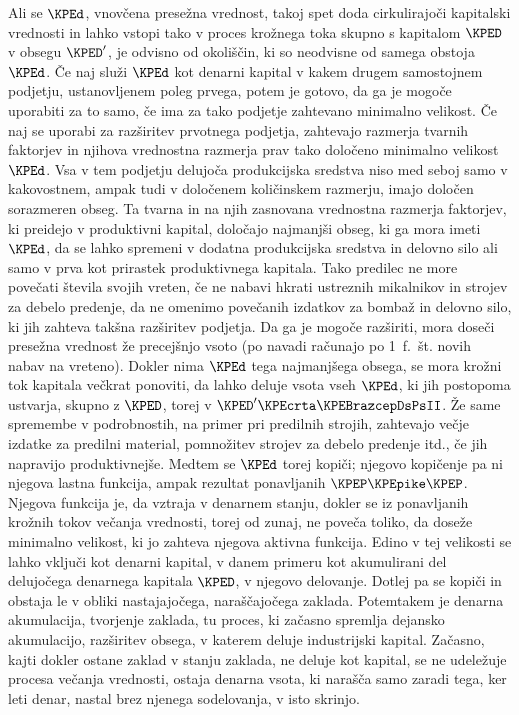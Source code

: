 \documentclass[kapital_02.tex]{subfiles}
\begin{document}
Ali \KPEstran se \( \KPEd \), vnovčena presežna vrednost, takoj spet doda cirkulirajoči kapitalski vrednosti in lahko vstopi tako v proces krožnega toka skupno s kapitalom \( \KPED \) v obsegu \( \KPED' \), je odvisno od okoliščin, ki so neodvisne od samega obstoja \( \KPEd \). Če naj služi \( \KPEd \) kot denarni kapital v kakem drugem samostojnem podjetju, ustanovljenem poleg prvega, potem je gotovo, da ga je mogoče uporabiti za to samo, če ima za tako podjetje zahtevano minimalno velikost. Če naj se uporabi za razširitev prvotnega podjetja, zahtevajo razmerja tvarnih faktorjev in njihova vrednostna razmerja prav tako določeno minimalno velikost \( \KPEd \). Vsa v tem podjetju delujoča produkcijska sredstva niso med seboj samo v kakovostnem, ampak tudi v določenem količinskem razmerju, imajo določen sorazmeren obseg. Ta tvarna in na njih zasnovana vrednostna razmerja faktorjev, ki preidejo v produktivni kapital, določajo najmanjši obseg, ki ga mora imeti \( \KPEd \), da se lahko spremeni v dodatna produkcijska sredstva in delovno silo ali samo v prva kot prirastek produktivnega kapitala. Tako predilec ne more povečati števila svojih vreten, če ne nabavi hkrati ustreznih mikalnikov in strojev za debelo predenje, da ne omenimo povečanih izdatkov za bombaž in delovno silo, ki jih zahteva takšna razširitev podjetja. Da ga je mogoče razširiti, mora doseči presežna vrednost že precejšnjo vsoto (po navadi računajo po 1\ f.\ št. novih nabav na vreteno). Dokler nima \( \KPEd \) tega najmanjšega obsega, se mora krožni tok kapitala večkrat ponoviti, da lahko deluje vsota vseh \( \KPEd \), ki jih postopoma ustvarja, skupno z \( \KPED \), torej v \( \KPED' \KPEcrta \KPEBrazcepDsPsII \). Že same spremembe v podrobnostih, na primer pri predilnih strojih, zahtevajo večje izdatke za predilni material, pomnožitev strojev za debelo predenje itd., če jih napravijo produktivnejše. Medtem se \( \KPEd \) torej kopiči; njegovo kopičenje pa ni njegova lastna funkcija, ampak rezultat ponavljanih \( \KPEP \KPEpike \KPEP \). Njegova funkcija je, da vztraja v denarnem stanju, dokler se iz ponavljanih krožnih tokov večanja \KPEstran vrednosti, torej od zunaj, ne poveča toliko, da doseže minimalno velikost, ki jo zahteva njegova aktivna funkcija. Edino v tej velikosti se lahko vključi kot denarni kapital, v danem primeru kot akumulirani del delujočega denarnega kapitala \( \KPED \), v njegovo delovanje. Dotlej pa se kopiči in obstaja le v obliki nastajajočega, naraščajočega zaklada. Potemtakem je denarna akumulacija, tvorjenje zaklada, tu proces, ki začasno spremlja dejansko akumulacijo, razširitev obsega, v katerem deluje industrijski kapital. Začasno, kajti dokler ostane zaklad v stanju zaklada, ne deluje kot kapital, se ne udeležuje procesa večanja vrednosti, ostaja denarna vsota, ki narašča samo zaradi tega, ker leti denar, nastal brez njenega sodelovanja, v isto skrinjo.
\end{document}
